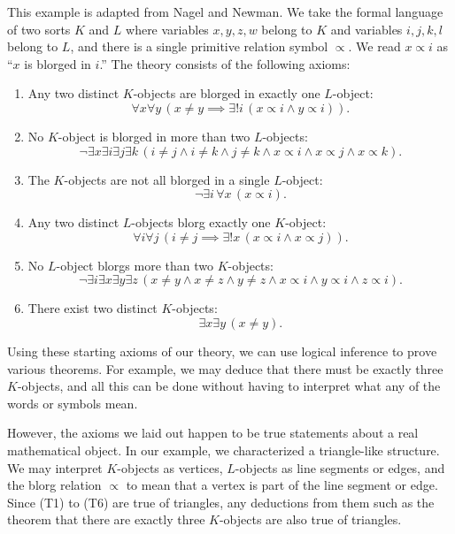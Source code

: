 \begin{example}\label{ch1ex_axioms_triang_NagelNewman}
	This example is adapted from Nagel and Newman. %
	We take the formal language of two sorts $K$ and $L$ where variables $x, y, z, w$ belong to $K$ and variables $i, j, k, l$ belong to $L$, and there is a single primitive relation symbol $\propto$.
	We read $x\propto i$ as ``$x$ is blorged in $i$.''
	The theory consists of the following axioms:
	\begin{enumerate}[itemsep=-0.4ex, label=\textup{(T\arabic*)}]
		\item Any two distinct $K$-objects are blorged in exactly one $L$-object:
		\[ \forall x\forall y\, (x\ne y\implies\exists ! i\, (x\propto i\land y\propto i)). \]
		\item No $K$-object is blorged in more than two $L$-objects:
		\[ \neg\exists x\exists i\exists j\exists k\,(i\ne j\land i\ne k\land j\ne k\land x\propto i\land x\propto j\land x\propto k). \]
		\item The $K$-objects are not all blorged in a single $L$-object:
		\[ \neg\exists i\,\forall x\,(x\propto i). \]
		\item Any two distinct $L$-objects blorg exactly one $K$-object:
		\[ \forall i\forall j\,(i\ne j\implies\exists!x\,(x\propto i\land x\propto j)). \]
		\item No $L$-object blorgs more than two $K$-objects:
		\[ \neg\exists i\exists x\exists y\exists z\,(x\ne y\land x\ne z\land y\ne z\land x\propto i\land y\propto i\land z\propto i). \]
		\item There exist two distinct $K$-objects:
		\[ \exists x\exists y\, (x\ne y). \]
	\end{enumerate}
	
	Using these starting axioms of our theory, we can use logical inference to prove various theorems. 
	For example, we may deduce that there must be exactly three $K$-objects, and all this can be done without having to interpret what any of the words or symbols mean. 
	
	However, the axioms we laid out happen to be true statements about a real mathematical object.
	In our example, we characterized a triangle-like structure. 
	We may interpret $K$-objects as vertices, $L$-objects as line segments or edges, and the blorg relation $\propto$ to mean that a vertex is part of the line segment or edge. 
	Since (T1) to (T6) are true of triangles, any deductions from them such as the theorem that there are exactly three $K$-objects are also true of triangles. 
	

\end{example}
